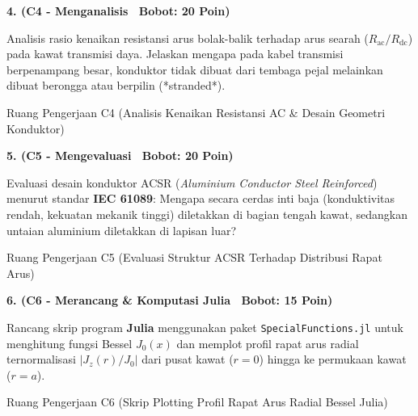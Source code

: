 \documentclass[10pt,a4paper]{article}
\begin{document}
\newpage

\noindent\textbf{4. (C4 - Menganalisis \textbar\ Bobot: 20 Poin)}\par\vspace{0.5mm}
{\footnotesize Analisis rasio kenaikan resistansi arus bolak-balik terhadap arus searah ($R_{\text{ac}}/R_{\text{dc}}$) pada kawat transmisi daya. Jelaskan mengapa pada kabel transmisi berpenampang besar, konduktor tidak dibuat dari tembaga pejal melainkan dibuat berongga atau berpilin (*stranded*).}
\begin{answerbox}{Ruang Pengerjaan C4 (Analisis Kenaikan Resistansi AC \& Desain Geometri Konduktor)}
  \vspace{3.8cm}
\end{answerbox}

\vspace{1.5mm}

\noindent\textbf{5. (C5 - Mengevaluasi \textbar\ Bobot: 20 Poin)}\par\vspace{0.5mm}
{\footnotesize Evaluasi desain konduktor ACSR (\textit{Aluminium Conductor Steel Reinforced}) menurut standar \textbf{IEC 61089}: Mengapa secara cerdas inti baja (konduktivitas rendah, kekuatan mekanik tinggi) diletakkan di bagian tengah kawat, sedangkan untaian aluminium diletakkan di lapisan luar?}
\begin{answerbox}{Ruang Pengerjaan C5 (Evaluasi Struktur ACSR Terhadap Distribusi Rapat Arus)}
  \vspace{3.8cm}
\end{answerbox}

\vspace{1.5mm}

\noindent\textbf{6. (C6 - Merancang \& Komputasi Julia \textbar\ Bobot: 15 Poin)}\par\vspace{0.5mm}
{\footnotesize Rancang skrip program \textbf{Julia} menggunakan paket \texttt{SpecialFunctions.jl} untuk menghitung fungsi Bessel $J_0(x)$ dan memplot profil rapat arus radial ternormalisasi $|J_z(r)/J_0|$ dari pusat kawat ($r=0$) hingga ke permukaan kawat ($r=a$).}
\begin{answerbox}{Ruang Pengerjaan C6 (Skrip Plotting Profil Rapat Arus Radial Bessel Julia)}
  \vspace{3.8cm}
\end{answerbox}

\vspace{1.5mm}
\end{document}
